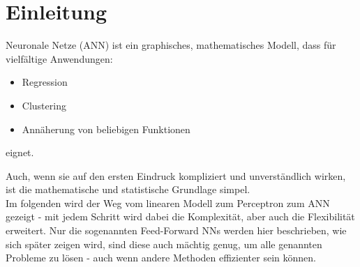 
\section{Einleitung}
Neuronale Netze (ANN) ist ein graphisches, mathematisches Modell, dass für vielfältige Anwendungen:

\begin{itemize}
\item Regression
\item Clustering
\item Annäherung von beliebigen Funktionen
\end{itemize}
 eignet. 

Auch, wenn sie auf den ersten Eindruck kompliziert und unverständlich wirken, ist die mathematische und statistische Grundlage simpel.\\
Im folgenden wird der Weg vom linearen Modell zum Perceptron zum ANN gezeigt - mit jedem Schritt wird dabei die Komplexität, aber auch die Flexibilität erweitert.
Nur die sogenannten Feed-Forward NNs werden hier beschrieben, wie sich später zeigen wird, sind diese auch mächtig genug, um alle genannten Probleme zu lösen - auch wenn andere Methoden effizienter sein können.